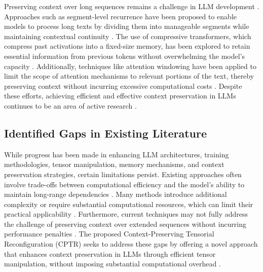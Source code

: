 Preserving context over long sequences remains a challenge in LLM development \cite{raines2024enhancing,desrochers2024reducing}. Approaches such as segment-level recurrence have been proposed to enable models to process long texts by dividing them into manageable segments while maintaining contextual continuity \cite{mcintosh2023culturally}. The use of compressive transformers, which compress past activations into a fixed-size memory, has been explored to retain essential information from previous tokens without overwhelming the model's capacity \cite{kuse2024dynamic}. Additionally, techniques like attention windowing have been applied to limit the scope of attention mechanisms to relevant portions of the text, thereby preserving context without incurring excessive computational costs \cite{mccartney2024introducing, la2024neural}. Despite these efforts, achieving efficient and effective context preservation in LLMs continues to be an area of active research \cite{kobrun2024contextual}.

\subsection{Identified Gaps in Existing Literature}

While progress has been made in enhancing LLM architectures, training methodologies, tensor manipulation, memory mechanisms, and context preservation strategies, certain limitations persist. Existing approaches often involve trade-offs between computational efficiency and the model's ability to maintain long-range dependencies \cite{arsal2024emerging}. Many methods introduce additional complexity or require substantial computational resources, which can limit their practical applicability \cite{radcliffe2024automated,satterfield2024fine}. Furthermore, current techniques may not fully address the challenge of preserving context over extended sequences without incurring performance penalties \cite{romanovna2024dynamic}. The proposed Context-Preserving Tensorial Reconfiguration (CPTR) seeks to address these gaps by offering a novel approach that enhances context preservation in LLMs through efficient tensor manipulation, without imposing substantial computational overhead \cite{tokar2024contextual}.